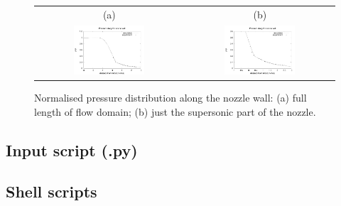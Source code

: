 \begin{figure}[htbp]
\begin{center}
\begin{tabular}{cc}
(a) & (b) \\
\includegraphics[width=0.5\textwidth]{../2D/back-nozzle/back_profile_whole.pdf} &
\includegraphics[width=0.5\textwidth]{../2D/back-nozzle/back_profile_supersonic.pdf}
\end{tabular}
\end{center}
\caption{Normalised pressure distribution along the nozzle wall:
         (a) full length of flow domain; 
	 (b) just the supersonic part of the nozzle.}
\label{back-profile-fig}
\end{figure}

\newpage
\subsection{Input script (.py)}
\topbar

\bottombar


\subsection{Shell scripts}
\label{back-sh-files}
\topbar

\bottombar

\noindent
\topbar

\bottombar

\noindent
\topbar
{}
\bottombar

